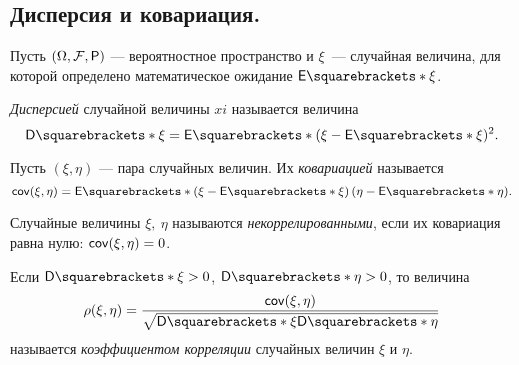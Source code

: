 \subsection{Дисперсия и ковариация.}
Пусть \((\Omega, \F, \Pr)\) --- вероятностное пространство и \(\xi\)~--- случайная величина, для которой определено математическое ожидание \(\E{\xi}\).
\begin{definition}
	\emph{Дисперсией} случайной величины \(xi\) называется величина \[\D{\xi}=\E{(\xi - \E{\xi})^2}.\]
\end{definition}
\begin{definition}
	Пусть \((\xi, \eta)\) --- пара случайных величин. Их \emph{ковариацией} называется \[\cov(\xi, \eta) = \E{\left(\xi - \E{\xi}\right)\left(\eta - \E{\eta}\right)}.\]
\end{definition}
\begin{definition}
	Случайные величины \(\xi,\ \eta \) называются \emph{некоррелированными}, если их ковариация равна нулю: \(\operatorname{\mathsf{cov}}(\xi, \eta) = 0\).
\end{definition}
\begin{definition}
	Если \(\D{\xi} > 0\), \(\D{\eta} > 0\), то величина \[\rho(\xi, \eta) = \frac{\cov(\xi, \eta)}{\sqrt{\D{\xi}\D{\eta}}}\] называется \emph{коэффициентом корреляции} случайных величин $ \xi $ и $ \eta $.
\end{definition}

